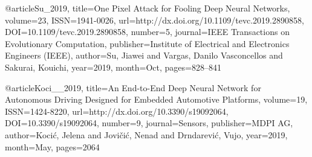 


@article{Su_2019,
   title={One Pixel Attack for Fooling Deep Neural Networks},
   volume={23},
   ISSN={1941-0026},
   url={http://dx.doi.org/10.1109/tevc.2019.2890858},
   DOI={10.1109/tevc.2019.2890858},
   number={5},
   journal={IEEE Transactions on Evolutionary Computation},
   publisher={Institute of Electrical and Electronics Engineers (IEEE)},
   author={Su, Jiawei and Vargas, Danilo Vasconcellos and Sakurai, Kouichi},
   year={2019},
   month={Oct},
   pages={828–841}
}


@article{Koci__2019, 
    title={An End-to-End Deep Neural Network for Autonomous Driving Designed for Embedded Automotive Platforms}, volume={19}, ISSN={1424-8220}, url={http://dx.doi.org/10.3390/s19092064}, DOI={10.3390/s19092064}, 
    number={9}, 
    journal={Sensors}, 
    publisher={MDPI AG}, 
    author={Kocić, Jelena and Jovičić, Nenad and Drndarević, Vujo}, year={2019}, 
    month={May}, 
    pages={2064}
}



